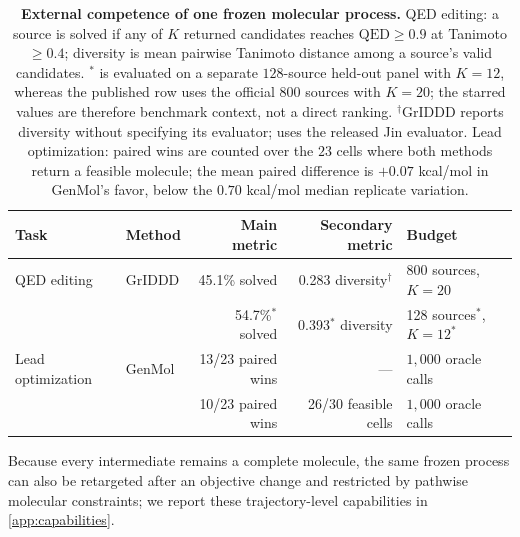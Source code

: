 \begin{table}[!ht]
\centering
{\small
\begin{tabular}{llrrl}
\toprule
Task & Method & Main metric & Secondary metric & Budget \\
\midrule
QED editing
 & GrIDDD \citep{ninniri2025griddd} & 45.1\% solved & 0.283 diversity$^{\dagger}$ & 800 sources, $K{=}20$ \\
 & \textbf{\method{}} & 54.7\%$^{*}$ solved & 0.393$^{*}$ diversity & 128 sources$^{*}$, $K{=}12^{*}$ \\
\midrule
Lead optimization
 & GenMol \citep{lee2025genmol} & 13/23 paired wins & --- & $1{,}000$ oracle calls \\
 & \textbf{\method{}} & 10/23 paired wins & 26/30 feasible cells & $1{,}000$ oracle calls \\
\bottomrule
\end{tabular}}
\caption{\small\textbf{External competence of one frozen molecular process.} QED editing: a source is solved if any of $K$ returned candidates reaches $\mathrm{QED}\ge0.9$ at Tanimoto $\ge0.4$; diversity is mean pairwise Tanimoto distance among a source's valid candidates. $^{*}$\method{} is evaluated on a separate $128$-source held-out panel with $K=12$, whereas the published row uses the official $800$ sources with $K=20$; the starred values are therefore benchmark context, not a direct ranking. $^{\dagger}$GrIDDD reports diversity without specifying its evaluator; \method{} uses the released Jin evaluator. Lead optimization: paired wins are counted over the $23$ cells where both methods return a feasible molecule; the mean paired difference is $+0.07$ kcal/mol in GenMol's favor, below the $0.70$ kcal/mol median replicate variation.}
\label{tab:external}
\end{table}

Because every intermediate remains a complete molecule, the same frozen process can also be retargeted after an objective change and restricted by pathwise molecular constraints; we report these trajectory-level capabilities in \cref{app:capabilities}.
